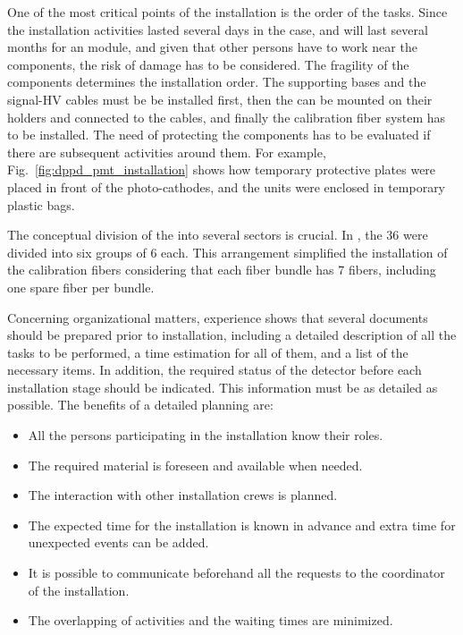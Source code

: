 One of the most critical points of the installation is the order of the tasks. Since the installation activities lasted several days in the  case, and will last several months for an  module, and given that other persons have to work near the  components, the risk of damage has to be considered. The fragility of the components determines the installation order. The  supporting bases and the signal-HV  cables must be be installed first, then the  can be mounted on their holders and connected to the cables, and finally the calibration fiber system has to be installed. The need of protecting the components has to be evaluated if there are subsequent activities around them. For example, Fig.~\ref{fig:dppd_pmt_installation} shows how temporary protective plates were placed in front of the   photo-cathodes, and the  units were enclosed in temporary plastic bags. 

The conceptual division of the   into several sectors is crucial. In , the \num{36}  were divided into six groups of \num{6}  each. This arrangement simplified the installation of the calibration fibers considering that each fiber bundle has \num{7} fibers, including one spare fiber per bundle. 

Concerning organizational matters,  experience shows that several documents should be prepared prior to installation, including a detailed description of all the tasks to be performed, a time estimation for all of them, and a list of the necessary items. In addition, the required status of the detector before each installation stage should be indicated. This information must be as detailed as possible. The benefits of a detailed planning are:

\begin{itemize}
\item All the persons participating in the  installation know their roles.
\item The required material is foreseen and available when needed.
\item The interaction with other installation crews is planned.
\item The expected time for the installation is known in advance and extra time for unexpected events can be added.
\item It is possible to communicate beforehand all the requests to the coordinator of the installation.
\item The overlapping of activities and the waiting times are minimized. 
\end{itemize}
